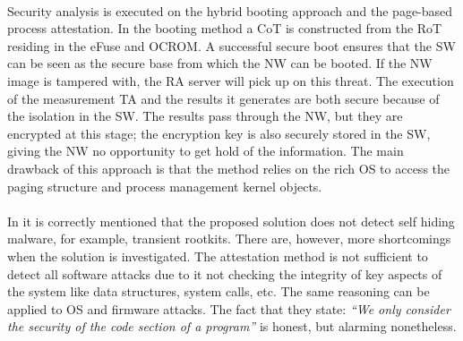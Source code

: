 \paragraph*{}
Security analysis is executed on the hybrid booting approach and the page-based process attestation. In the booting method a CoT is constructed from the RoT residing in the eFuse and OCROM. A successful secure boot ensures that the SW can be seen as the secure base from which the NW can be booted. If the NW image is tampered with, the RA server will pick up on this threat. The execution of the measurement TA and the results it generates are both secure because of the isolation in the SW. The results pass through the NW, but they are encrypted at this stage; the encryption key is also securely stored in the SW, giving the NW no opportunity to get hold of the information. The main drawback of this approach is that the method relies on the rich OS to access the paging structure and process management kernel objects.

\paragraph*{}
In \cite{LingZhen2021Sbtb} it is correctly mentioned that the proposed solution does not detect self hiding malware, for example, transient rootkits. There are, however, more shortcomings when the solution is investigated. The attestation method is not sufficient to detect all software attacks due to it not checking the integrity of key aspects of the system like data structures, system calls, etc. The same reasoning can be applied to OS and firmware attacks. The fact that they state: \textit{\enquote{We only consider the security of the code section of a program}} is honest, but alarming nonetheless.  